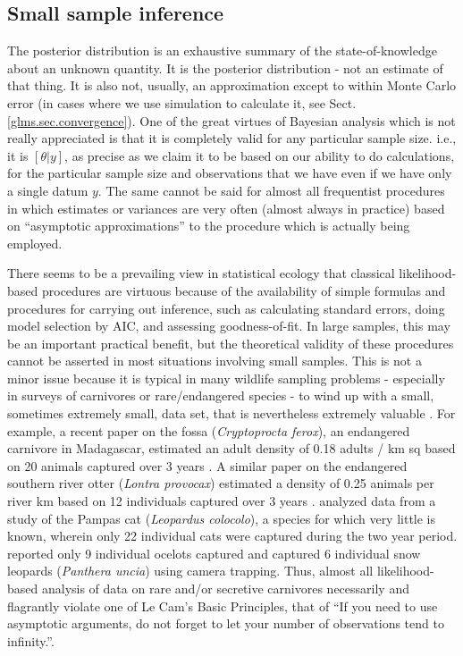 \subsection{Small sample inference}

The posterior
distribution is an exhaustive summary of the state-of-knowledge
about an unknown quantity. It is the posterior distribution - not an
estimate of that thing. It is also not, usually, an approximation
except to within Monte Carlo error (in cases where we use simulation
to calculate it, see Sect. \ref{glms.sec.convergence}).  One of the great virtues of Bayesian analysis which
is not really appreciated is that it is completely valid for any
particular sample size. i.e., it is $[\theta|y]$, as precise as we
claim it to be based on our ability to do calculations, for the
particular sample size and observations that we have even if we have
only a single datum $y$.  The same cannot be said for almost all
frequentist procedures in which estimates or variances are very often
(almost always in practice) based on ``asymptotic approximations'' to
the procedure which is actually being employed.

There seems to be a prevailing view in statistical ecology that
classical likelihood-based procedures are virtuous because of the
availability of simple formulas and procedures for carrying out
inference, such as calculating standard errors, doing model selection
by AIC, and assessing goodness-of-fit.  In large samples, this may be
an important practical benefit, but the theoretical validity of these
procedures cannot be asserted in most situations involving small
samples.  This is not a minor issue because it is typical in many
wildlife sampling problems - especially in surveys of carnivores or
rare/endangered species - to wind up with a small, sometimes extremely
small, data set, that is nevertheless extremely valuable \citep{foster_harmsen:2012}. For example, a recent paper on the fossa
(\emph{Cryptoprocta ferox}), an endangered carnivore in Madagascar, estimated
an adult density of 0.18 adults / km sq based on 20 animals captured
over 3 years \citep{hawkins_racey:2005}. A similar paper on the
endangered southern river otter (\emph{Lontra provocax}) estimated a density
of 0.25 animals per river km based on 12 individuals captured over 3
years \citep{sepulveda_etal:2007}. \citet{gardner_etal:2010ecol} analyzed
data from a study of the Pampas cat (\emph {Leopardus colocolo}), a species for which very little
is known, wherein only 22 individual cats were captured during the
two year period.  \citet{trolle_kery:2005} reported only 9 individual
ocelots captured and \citet{jackson_etal:2006} captured 6 individual
snow leopards (\emph{Panthera uncia}) using camera trapping. Thus, almost all likelihood-based
analysis of data on rare and/or
secretive carnivores necessarily and flagrantly violate one of Le
Cam's Basic Principles, that of ``If you need to use asymptotic
arguments, do not forget to let your number of observations tend to
infinity.''\citep{lecam:1990}.


